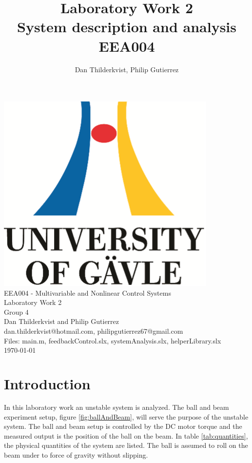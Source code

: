 \documentclass[a4paper, titlepage]{article}
\title{Laboratory Work 2\\
System description and analysis\\
\large EEA004}
\author{Dan Thilderkvist, Philip Gutierrez}
\begin{document}
\begin{titlepage}
\begin{center}
\vspace*{1cm}
\includegraphics[scale=1.0]{../figures/hig_logo_eng.png}\\
\vspace{1.5cm}
\large EEA004 - Multivariable and Nonlinear Control Systems\\
\large Laboratory Work 2\\
\vspace{1.5cm}
Group 4\\
Dan Thilderkvist and Philip Gutierrez\\
dan.thilderkvist@hotmail.com, philipgutierrez67@gmail.com\\
Files: main.m, feedbackControl.slx, systemAnalysis.slx, helperLibrary.slx\\
\vspace{1cm}
\today
\end{center}
\end{titlepage}

\tableofcontents
\clearpage

\section{Introduction}
In this laboratory work an unstable system is analyzed.
The ball and beam experiment setup, figure \ref{fig:ballAndBeam}, will serve the purpose of the unstable system.
The ball and beam setup is controlled by the DC motor torque and the measured output is the position of the ball on the beam.
In table \ref{tab:quantities}, the physical quantities of the system are listed.
The ball is assumed to roll on the beam under to force of gravity without slipping.
\end{document}
